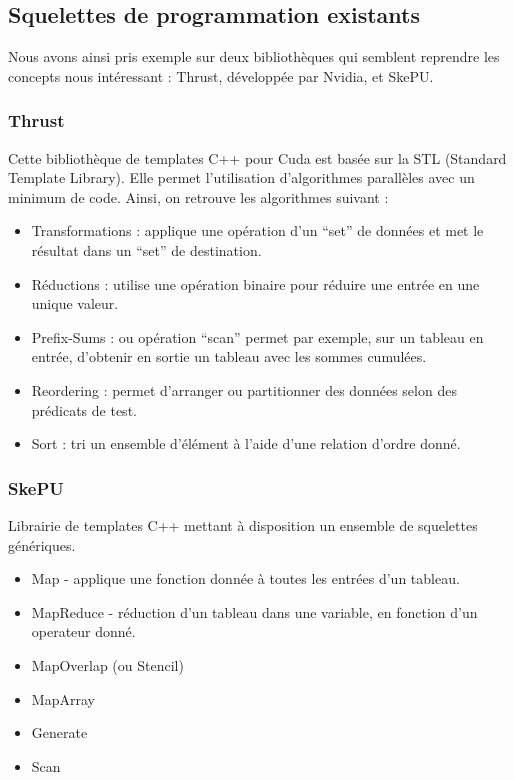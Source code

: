 \documentclass{report}
\begin{document}
\begin{itemize}
\subsection{Squelettes de programmation existants}
Nous avons ainsi pris exemple sur deux bibliothèques qui semblent reprendre les concepts nous intéressant : Thrust, développée par Nvidia, et SkePU.

\subsubsection{Thrust}
Cette bibliothèque de templates C++ pour Cuda est basée sur la STL (Standard Template Library). Elle permet l’utilisation d’algorithmes parallèles avec un minimum de code. Ainsi, on retrouve les algorithmes suivant :

\begin{itemize}
\item Transformations : applique une opération d’un “set” de données et met le résultat dans un “set” de destination. 
\item Réductions : utilise une opération binaire pour réduire une entrée en une unique valeur. 
\item Prefix-Sums : ou opération “scan” permet par exemple, sur un tableau en entrée, d’obtenir en sortie un tableau avec les sommes cumulées.
\item Reordering : permet d’arranger ou partitionner des données selon des prédicats de test.
\item Sort : tri un ensemble d’élément à l’aide d’une relation d’ordre donné.
\end{itemize}

\subsubsection{SkePU}
Librairie de templates C++ mettant à disposition un ensemble de squelettes génériques.

\begin{itemize}
\item Map\cite{refMap} - applique une fonction donnée à toutes les entrées d’un tableau.
\item MapReduce - réduction d’un tableau dans une variable, en fonction d’un operateur donné.
\item MapOverlap (ou Stencil)
\item MapArray
\item Generate
\item Scan
\end{itemize}


\end{itemize}
\end{document}
